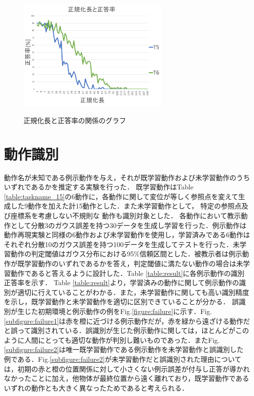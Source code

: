 \begin{figure}[h]
\begin{minipage}[t]{.49\textwidth}
		\label{subfigure:unit_c}
	\end{minipage}
	\begin{minipage}[t]{.49\textwidth}
		\centering
		\includegraphics[width=7.5cm]{chart11_d.png} \\ %
		\label{subfigure:unit_d}
	\end{minipage}
	\caption{正規化長と正答率の関係のグラフ}
	\label{figure:success_rate_for_UNIT}
\end{figure}

\clearpage

\section{動作識別}

動作名が未知である例示動作を与え，それが既学習動作および未学習動作のうちいずれであるかを推定する実験を行った．
既学習動作はTable \ref{table:taskname_15}の6動作に，各動作に関して変位が等しく参照点を変えて生成した9動作を加えた計15動作とした．また未学習動作として，
特定の参照点及び座標系を考慮しない不規則な
動作も識別対象とした．
各動作において教示動作として分散3のガウス誤差を持つ30データを生成し学習を行った．例示動作は動作再現実験と同様の6動作および未学習動作を使用し，学習済みである6動作はそれぞれ分散10のガウス誤差を持つ100データを生成してテストを行った．未学習動作の判定閾値はガウス分布における95\%信頼区間とした．被教示者は例示動作が既学習動作のいずれであるかを答え，判定閾値に満たない動作の場合は未学習動作であると答えるように設計した．Table \ref{table:result}に各例示動作の識別正答率を示す．
Table \ref{table:result}より，学習済みの動作に関して例示動作の識別が適切に行えていることがわかる．また，未学習動作に関しても高い識別精度を示し，既学習動作と未学習動作を適切に区別できていることが分かる．
誤識別が生じた初期環境と例示動作の例をFig.\ref{figure:failure}に示す．Fig.\ref{subfigure:failure1}は赤を橙に近づける例示動作だが，赤を緑から遠ざける動作だと誤って識別されている．誤識別が生じた例示動作に関しては，ほとんどがこのように人間にとっても適切な動作が判別し難いものであった．またFig.\ref{subfigure:failure2}は唯一既学習動作である例示動作を未学習動作と誤識別した例である．Fig.\ref{subfigure:failure2}が未学習動作だと誤識別された理由については，初期の赤と橙の位置関係に対して小さくない例示誤差が付与し正答が導かれなかったことに加え，他物体が最終位置から遠く離れており，既学習動作であるいずれの動作とも大きく異なったためであると考えられる．


